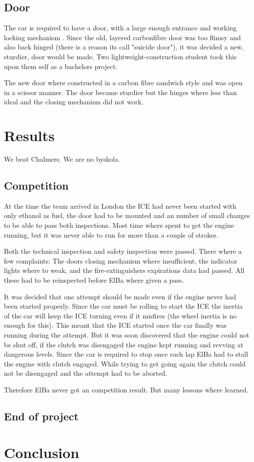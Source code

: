\subsection{Door}
The car is required to have a door, with a large enough entrance and working locking mechanism \cite{semrules16c1}. Since the old, layered carbonfibre door was too flimsy and also back hinged (there is a reason its call "suicide door"), it was decided a new, sturdier, door would be made. Two lightweight-construction student took this upon them self as a bachelors project. 

The new door where constructed in a carbon fibre sandwich style and was open in a scissor manner. The door became sturdier but the hinges where less than ideal and the closing mechanism did not work.

\section{Results}
We beat Chalmers. We are no byskola.
\subsection{Competition}
At the time the team arrived in London the ICE had never been started with only ethanol as fuel, the door had to be mounted and an number of small changes to be able to pass both inspections. Most time where spent to get the engine running, but it was never able to run for more than a couple of strokes. 

Both the technical inspection and safety inspection were passed. There where a few complaints: The doors closing mechanism where insufficient, the indicator lights where to weak, and the fire-extinguishers expirations data had passed. All these had to be reinspected before ElBa where given a pass.

It was decided that one attempt should be made even if the engine never had been started properly. Since the car must be rolling to start the ICE the inertia of the car will keep the ICE turning even if it misfires (the wheel inertia is no enough for this). This meant that the ICE started once the car finally was running during the attempt. But it was soon discovered that the engine could not be shut off, if the clutch was disengaged the engine kept running and revving at dangerous levels. Since the car is required to stop once each lap ElBa had to stall the engine with clutch engaged. While trying to get going again the clutch could not be disengaged and the attempt had to be aborted.

Therefore ElBa never got an competition result. But many lessons where learned.

\subsection{End of project}

\section{Conclusion}
